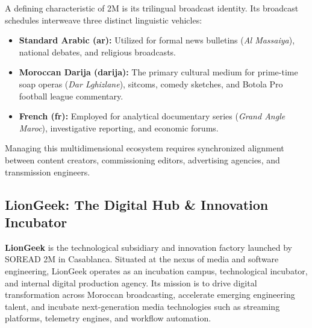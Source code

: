 \documentclass[12pt,a4paper,oneside]{report}
\begin{document}
A defining characteristic of 2M is its trilingual broadcast identity. Its broadcast schedules interweave three distinct linguistic vehicles:
\begin{itemize}
    \item \textbf{Standard Arabic (ar):} Utilized for formal news bulletins (\textit{Al Massaiya}), national debates, and religious broadcasts.
    \item \textbf{Moroccan Darija (darija):} The primary cultural medium for prime-time soap operas (\textit{Dar Lghizlane}), sitcoms, comedy sketches, and Botola Pro football league commentary.
    \item \textbf{French (fr):} Employed for analytical documentary series (\textit{Grand Angle Maroc}), investigative reporting, and economic forums.
\end{itemize}

Managing this multidimensional ecosystem requires synchronized alignment between content creators, commissioning editors, advertising agencies, and transmission engineers.

\subsection{LionGeek: The Digital Hub \& Innovation Incubator}
\textbf{LionGeek} is the technological subsidiary and innovation factory launched by SOREAD 2M in Casablanca. Situated at the nexus of media and software engineering, LionGeek operates as an incubation campus, technological incubator, and internal digital production agency. Its mission is to drive digital transformation across Moroccan broadcasting, accelerate emerging engineering talent, and incubate next-generation media technologies such as streaming platforms, telemetry engines, and workflow automation.
\end{document}
